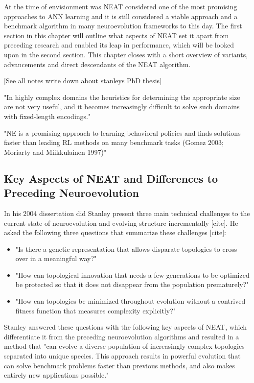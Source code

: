\documentclass[journal, a4paper]{IEEEtran}
\begin{document}
At the time of envisionment was NEAT considered one of the most promising approaches to ANN learning and it is still considered a viable approach and a benchmark algorithm in many neuroevolution frameworks to this day. The first section in this chapter will outline what aspects of NEAT set it apart from preceding research and enabled its leap in performance, which will be looked upon in the second section. This chapter closes with a short overview of variants, advancements and direct descendants of the NEAT algorithm.





[See all notes write down about stanleys PhD thesis]

"In highly complex domains the heuristics for determining the appropriate size are not very useful, and it becomes increasingly difficult to solve such domains with fixed-length encodings." \cite{sta04}

"NE is a promising approach to learning behavioral policies and finds solutions faster than leading RL methods on many benchmark tasks (Gomez 2003; Moriarty and Miikkulainen 1997)" \cite{sta04}



\subsection{Key Aspects of NEAT and Differences to Preceding Neuroevolution}

In his 2004 dissertation did Stanley present three main technical challenges to the current state of neuroevolution and evolving structure incrementally [cite]. He asked the following three questions that summarize these challenges [cite]:

\begin{itemize}
    \item "Is there a genetic representation that allows disparate topologies to cross over in a meaningful way?"
    \item "How can topological innovation that needs a few generations to be optimized be protected so that it does not disappear from the population prematurely?"
    \item "How can topologies be minimized throughout evolution without a contrived fitness function that measures complexity explicitly?"
\end{itemize}

Stanley answered these questions with the following key aspects of NEAT, which differentiate it from the preceding neuroevolution algorithms and resulted in a method that "can evolve a diverse population of increasingly complex topologies separated into unique species. This approach results in powerful evolution that can solve benchmark problems faster than previous methods, and also makes entirely new applications possible."
\end{document}

